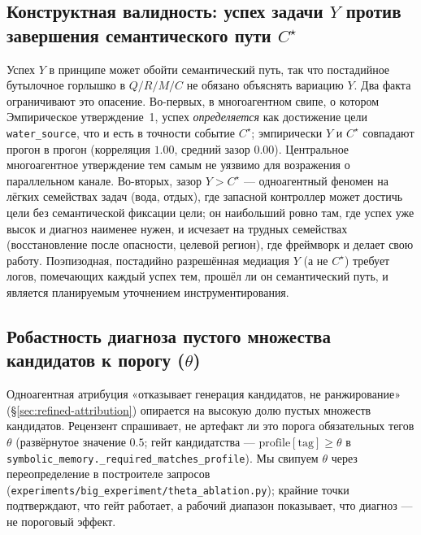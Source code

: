 \documentclass{article}
\newcommand{\method}[1]{\texttt{#1}}
\begin{document}
\subsection{Конструктная валидность: успех задачи $Y$ против завершения семантического пути $C^\star$}
\label{app:y-vs-c}

Успех $Y$ в принципе может обойти семантический путь, так что постадийное бутылочное горлышко в $Q/R/M/C$ не обязано объяснять вариацию $Y$. Два факта ограничивают это опасение. Во-первых, в многоагентном свипе, о котором Эмпирическое утверждение~1, успех \emph{определяется} как достижение цели \texttt{water\_source}, что и есть в точности событие $C^\star$; эмпирически $Y$ и $C^\star$ совпадают прогон в прогон (корреляция $1.00$, средний зазор $0.00$). Центральное многоагентное утверждение тем самым не уязвимо для возражения о параллельном канале. Во-вторых, зазор $Y>C^\star$ --- одноагентный феномен на лёгких семействах задач (вода, отдых), где запасной контроллер может достичь цели без семантической фиксации цели; он наибольший ровно там, где успех уже высок и диагноз наименее нужен, и исчезает на трудных семействах (восстановление после опасности, целевой регион), где фреймворк и делает свою работу. Поэпизодная, постадийно разрешённая медиация $Y$ (а не $C^\star$) требует логов, помечающих каждый успех тем, прошёл ли он семантический путь, и является планируемым уточнением инструментирования.

\subsection{Робастность диагноза пустого множества кандидатов к порогу ($\theta$)}
\label{app:theta-robustness}

Одноагентная атрибуция «отказывает генерация кандидатов, не ранжирование»
(\S\ref{sec:refined-attribution}) опирается на высокую долю пустых множеств кандидатов.
Рецензент спрашивает, не артефакт ли это порога обязательных тегов
$\theta$ (развёрнутое значение $0.5$; гейт кандидатства ---
$\mathrm{profile}[\text{tag}]\ge\theta$ в
\method{symbolic\_memory.\_required\_matches\_profile}). Мы свипуем $\theta$ через
переопределение в построителе запросов (\method{experiments/big\_experiment/theta\_ablation.py});
крайние точки подтверждают, что гейт работает, а рабочий диапазон показывает, что
диагноз --- не пороговый эффект.
\end{document}
